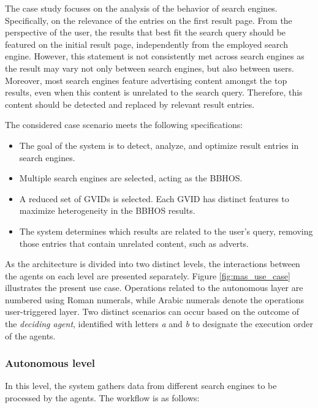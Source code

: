 The case study focuses on the analysis of the behavior of search engines. Specifically, on the relevance of the entries on the first result page. From the perspective of the user, the results that best fit the search query should be featured on the initial result page, independently from the employed search engine. However, this statement is not consistently met across search engines as the result may vary not only between search engines, but also between users. Moreover, most search engines feature advertising content amongst the top results, even when this content is unrelated to the search query. Therefore, this content should be detected and replaced by relevant result entries.

The considered case scenario meets the following specifications:
\begin{itemize}
    \item The goal of the system is to detect, analyze, and optimize result entries in search engines.
    \item Multiple search engines are selected, acting as the BBHOS.
    \item A reduced set of GVIDs is selected. Each GVID has distinct features to maximize heterogeneity in the BBHOS results.
    \item The system determines which results are related to the user's query, removing those entries that contain unrelated content, such as adverts.
\end{itemize}

As the architecture is divided into two distinct levels, the interactions between the agents on each level are presented separately. Figure \ref{fig:mas_use_case} illustrates the present use case. Operations related to the autonomous layer are numbered using Roman numerals, while Arabic numerals denote the operations user-triggered layer. Two distinct scenarios can occur based on the outcome of the \textit{deciding agent}, identified with letters \textit{a} and \textit{b} to designate the execution order of the agents.

\subsubsection*{Autonomous level}
In this level, the system gathers data from different search engines to be processed by the agents. The workflow is as follows:

